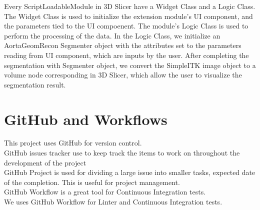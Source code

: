Every ScriptLoadableModule in 3D Slicer have a Widget Class and a Logic Class. The Widget Class is used to initialize the extension module's UI component, and the parameters tied to the UI compoenent. The module's Logic Class is used to perform the processing of the data. In the Logic Class, we initialize an AortaGeomRecon Segmenter object with the attributes set to the parameters reading from UI component, which are inputs by the user. After completing the segmentation with Segmenter object, we convert the SimpleITK image object to a volume node corresponding in 3D Slicer, which allow the user to visualize the segmentation result. 

\section{GitHub and Workflows}
This project uses GitHub for version control. \\
GitHub issues tracker use to keep track the items to work on throughout the development of the project\\
GitHub Project is used for dividing a large issue into smaller tasks, expected date of the completion. This is useful for project management.\\
GitHub Workflow is a great tool for Continuous Integration tests. \\
We uses GitHub Workflow for Linter and Continuous Integration tests. 





%


